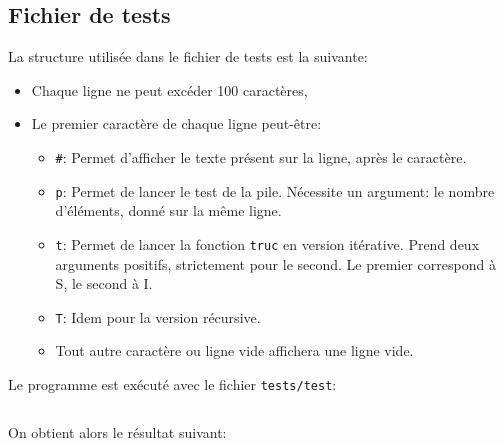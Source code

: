 \subsection{Fichier de tests}
	La structure utilisée dans le fichier de tests est la suivante:
	\begin{itemize}
		\item Chaque ligne ne peut excéder 100 caractères,
		\item Le premier caractère de chaque ligne peut-être:
		\begin{itemize}
			\item \texttt{\#}: Permet d'afficher le texte présent sur la ligne, après le caractère.
			\item \texttt{p}: Permet de lancer le test de la pile. Nécessite un argument: le nombre d'éléments, donné sur la même ligne.
			\item \texttt{t}: Permet de lancer la fonction \texttt{truc} en version itérative. Prend deux arguments positifs, strictement pour le second. Le premier correspond à S, le second à I.
			\item \texttt{T}: Idem pour la version récursive.
			\item Tout autre caractère ou ligne vide affichera une ligne vide.
		\end{itemize}
	\end{itemize}
	Le programme est exécuté avec le fichier \texttt{tests/test}:
	\inputminted[frame=single,label=Test]{text}{../tests/test}
	On obtient alors le résultat suivant: 
	\inputminted[frame=single,label=Resultat]{text}{../tests/resultat_test}

